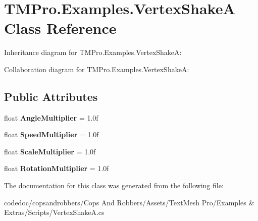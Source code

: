 \hypertarget{classTMPro_1_1Examples_1_1VertexShakeA}{}\section{T\+M\+Pro.\+Examples.\+Vertex\+ShakeA Class Reference}
\label{classTMPro_1_1Examples_1_1VertexShakeA}


Inheritance diagram for T\+M\+Pro.\+Examples.\+Vertex\+ShakeA\+:


Collaboration diagram for T\+M\+Pro.\+Examples.\+Vertex\+ShakeA\+:
\subsection*{Public Attributes}
\begin{DoxyCompactItemize}
\item 
\mbox{\label{classTMPro_1_1Examples_1_1VertexShakeA_a8a3fca222f496902c262c53683d3f94e}} 
float {\bfseries Angle\+Multiplier} = 1.\+0f
\item 
\mbox{\label{classTMPro_1_1Examples_1_1VertexShakeA_a10bf945b918292c2ea7552dd86f6a4ec}} 
float {\bfseries Speed\+Multiplier} = 1.\+0f
\item 
\mbox{\label{classTMPro_1_1Examples_1_1VertexShakeA_a9e03d577c862b3b95e7309143c0a1d74}} 
float {\bfseries Scale\+Multiplier} = 1.\+0f
\item 
\mbox{\label{classTMPro_1_1Examples_1_1VertexShakeA_ab4bd4cb50926999b1a1ac59da8fcf7f1}} 
float {\bfseries Rotation\+Multiplier} = 1.\+0f
\end{DoxyCompactItemize}


The documentation for this class was generated from the following file\+:\begin{DoxyCompactItemize}
\item 
codedoc/copsandrobbers/\+Cops And Robbers/\+Assets/\+Text\+Mesh Pro/\+Examples \& Extras/\+Scripts/Vertex\+Shake\+A.\+cs\end{DoxyCompactItemize}
